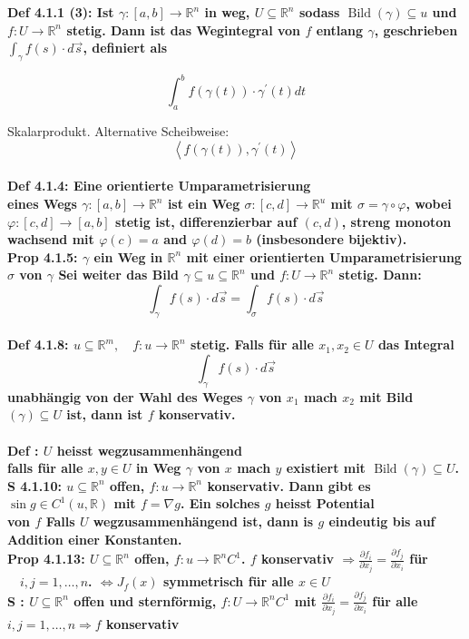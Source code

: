 \documentclass[7pt,landscape, margin = 0.1mm]{article}
\newcommand{\COL}[1]{ \color{chaptercolor} \bf{#1}\color{black}     \\}
\newcommand{\DEF}[2]{\color{chaptercolor}\bf{Def #1}:\color{black}    \hspace{0.2cm} #2 \\}
\newcommand{\PROP}[2]{\color{chaptercolor}\bf{Prop #1}:\color{black}    \hspace{0.2cm} #2 \\}
\newcommand{\SA}[2]{\color{chaptercolor}\bf{S #1}:\color{black}    \hspace{0.2cm} #2 \\}
\begin{document}
\begin{multicols}{4}
\begin{flushleft}
\DEF{4.1.1 (3)}{Ist $\gamma:[a, b] \rightarrow \mathbb{R}^n$ in weg, $U \subseteq \mathbb{R}^n$ sodass $\operatorname{Bild}(\gamma) \subseteq u$ und $f: U \rightarrow \mathbb{R}^n$ stetig. Dann ist das Wegintegral von $f$ entlang $\gamma$, geschrieben $\int_\gamma f(s) \cdot d \vec{s}$, definiert als
 
 $$
 \int_a^b f(\gamma(t)) \cdot \gamma^{\prime}(t) d t
 $$
 
 Skalarprodukt. Alternative Scheibweise:
 $$
 \left\langle f(\gamma(t)), \gamma^{\prime}(t)\right\rangle
 $$}

\DEF{4.1.4}{Eine \COL{orientierte Umparametrisierung} eines Wegs $\gamma:[a, b] \rightarrow \mathbb{R}^n$ ist ein Weg $\sigma:[c, d] \rightarrow \mathbb{R}^u$ mit $\sigma=\gamma \circ \varphi$, wobei $\varphi:[c, d] \rightarrow[a, b]$ stetig ist, differenzierbar auf $(c, d)$, streng monoton wachsend mit $\varphi(c)=a$ and $\varphi(d)=b$ (insbesondere bijektiv).}

\PROP{4.1.5}{$\gamma$ ein Weg in $\mathbb{R}^n$ mit einer orientierten Umparametrisierung $\sigma$ von $\gamma$ 
Sei weiter das Bild $\gamma \subseteq u \subseteq \mathbb{R}^n$ und $f: U \rightarrow \mathbb{R}^n$ stetig. Dann: $$
\int_\gamma f(s) \cdot d \vec{s}=\int_\sigma f(s) \cdot d \vec{s}
$$}

\DEF{4.1.8}{ $u \subseteq \mathbb{R}^m, \quad f: u \rightarrow \mathbb{R}^n$ stetig. Falls für alle $x_1, x_2 \in U$ das Integral
 $$
 \int_\gamma f(s) \cdot d \vec{s}
 $$
 unabhängig von der Wahl des Weges $\gamma$ von $x_1$ mach $x_2$ mit Bild $(\gamma) \subseteq U$ ist, dann ist $f$ \COL{konservativ.}}
 
 \DEF{}{$U$ heisst \COL{wegzusammenhängend} falls für alle $x, y \in U$ in Weg $\gamma$ von $x$ mach $y$ existiert mit $\operatorname{Bild}(\gamma)\subseteq U$.}
 
 \SA{4.1.10}{$u \subseteq \mathbb{R}^n$ offen, $f: u \rightarrow \mathbb{R}^n$ konservativ. Dann gibt es $\sin g \in C^1(u, \mathbb{R})$ mit $f=\nabla g$. Ein solches $g$ heisst \COL{Potential} von $f$ Falls $U$ wegzusammenhängend ist, dann is $g$ eindeutig bis auf Addition einer Konstanten.}
 
 
 \PROP{4.1.13}{$U \subseteq \mathbb{R}^n$ offen, $f: u \rightarrow \mathbb{R}^n C^1$.
$f$ konservativ $\Rightarrow \frac{\partial f_i}{\partial x_j}=\frac{\partial f_j}{\partial x_i}$ für $\quad i, j=1, \ldots, n$. $\Leftrightarrow J_f(x)$ symmetrisch für alle $x \in U$}

\SA{}{$U \subseteq \mathbb{R}^n$ offen und sternförmig, $f: U \rightarrow \mathbb{R}^n C^1$ mit $\frac{\partial f_i}{\partial x_j}=\frac{\partial f_j}{\partial x_i}$ für alle $i, j=1, \ldots, n \Rightarrow f$ konservativ}


\end{flushleft}
\end{multicols}
\end{document}
